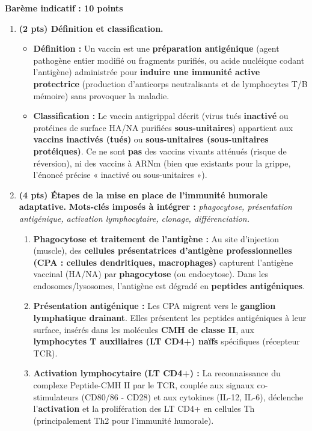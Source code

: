 \documentclass[11pt]{article}
\begin{document}

\begin{corrige}
\textbf{Barème indicatif : 10 points}
\begin{enumerate}
    \item \textbf{(2 pts) Définition et classification.}
    \begin{itemize}
        \item \textbf{Définition :} Un vaccin est une \textbf{préparation antigénique} (agent pathogène entier modifié ou fragments purifiés, ou acide nucléique codant l'antigène) administrée pour \textbf{induire une immunité active protectrice} (production d'anticorps neutralisants et de lymphocytes T/B mémoire) sans provoquer la maladie.
        \item \textbf{Classification :} Le vaccin antigrippal décrit (virus tués \textbf{inactivé} ou protéines de surface HA/NA purifiées \textbf{sous-unitaires}) appartient aux \textbf{vaccins inactivés (tués)} ou \textbf{sous-unitaires (sous-unitaires protéiques)}. Ce ne sont \textbf{pas} des vaccins vivants atténués (risque de réversion), ni des vaccins à ARNm (bien que existants pour la grippe, l'énoncé précise « inactivé ou sous-unitaires »).
    \end{itemize}
    \item \textbf{(4 pts) Étapes de la mise en place de l'immunité humorale adaptative.}
    \textbf{Mots-clés imposés à intégrer :} \textit{phagocytose, présentation antigénique, activation lymphocytaire, clonage, différenciation.}
    \begin{enumerate}
        \item \textbf{Phagocytose et traitement de l'antigène :} Au site d'injection (muscle), des \textbf{cellules présentatrices d'antigène professionnelles (CPA : cellules dendritiques, macrophages)} capturent l'antigène vaccinal (HA/NA) par \textbf{phagocytose} (ou endocytose). Dans les endosomes/lysosomes, l'antigène est dégradé en \textbf{peptides antigéniques}.
        \item \textbf{Présentation antigénique :} Les CPA migrent vers le \textbf{ganglion lymphatique drainant}. Elles présentent les peptides antigéniques à leur surface, insérés dans les molécules \textbf{CMH de classe II}, aux \textbf{lymphocytes T auxiliaires (LT CD4+) naïfs} spécifiques (récepteur TCR).
        \item \textbf{Activation lymphocytaire (LT CD4+) :} La reconnaissance du complexe Peptide-CMH II par le TCR, couplée aux signaux co-stimulateurs (CD80/86 - CD28) et aux cytokines (IL-12, IL-6), déclenche l'\textbf{activation} et la prolifération des LT CD4+ en cellules Th (principalement Th2 pour l'immunité humorale).

\end{enumerate}
\end{enumerate}
\end{corrige}
\end{document}
